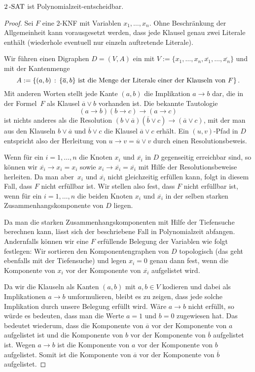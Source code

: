 \begin{thm}
	${2}\operatorname{-SAT}$ ist Polynomialzeit-entscheidbar.  
\end{thm} 
\begin{proof}
	Sei $F$ eine $2$-KNF mit Variablen $x_1,\ldots,x_n$. Ohne Beschränkung der Allgemeinheit kann vorausgesetzt werden, dass jede Klausel genau zwei Literale enthält (wiederhole eventuell nur einzeln auftretende Literale).
	
	Wir führen einen Digraphen $D=(V,A)$ ein mit 
	$V := \{x_1,\ldots,x_n,\overline{x_1},\ldots,\overline{x_n} \}$ und mit der Kantenmenge 
	\[
			A := \left\{ (a,b) \,:\,  \{\overline{a},b\} \ \text{ist die Menge der Literale einer der Klauseln von} \  F \right\} .
	\]
	Mit anderen Worten stellt jede Kante $(a,b)$ die Implikation $a \to b$ dar, die in der Formel~$F$ als Klausel $\overline{a} \vee b$ vorhanden ist.
\condclearpage	
	Die bekannte Tautologie 
	\[
		 	(a \to b) (b \to c)  \to (a \to c)
	\]
	ist nichts anderes als die Resolution $(b \vee \overline{a}) ( \overline{b} \vee c) \to (\overline{a} \vee c)$, mit der man aus den Klauseln $b \vee \overline{a}$ und  $\overline{b} \vee c$ die Klausel $\overline{a} \vee c$ erhält. Ein $(u,v)$-Pfad in $D$ entspricht also der Herleitung von $u \to v = \overline{u} \vee v$ durch einen Resolutionsbeweis.
	
	Wenn für ein $i=1,\ldots,n$ die Knoten $x_i$ und $\overline{x_i}$ in $D$ gegenseitig erreichbar sind, so können wir $\overline{x_i} \to  x_i  = x_i$ sowie $x_i \to \overline{x_i} = \overline{x_i}$ mit Hilfe der Resolutionsbeweise herleiten. Da man aber~$x_i$ und $\overline{x_i}$ nicht gleichzeitig erfüllen kann, folgt in diesem Fall, dass $F$ nicht erfüllbar ist. 
	Wir stellen also fest, dass $F$ nicht erfüllbar ist, wenn für ein $i =1,\ldots,n$ die beiden Knoten $x_i$ und $\overline{x_i}$ in der selben starken Zusammenhangskomponente von $D$ liegen. 
	
	 Da man die starken Zusammenhangskomponenten mit Hilfe der Tiefensuche berechnen kann, lässt sich der beschriebene Fall in Polynomialzeit abfangen. 
\condclearpage	
	Andernfalls können wir eine $F$ erfüllende Belegung der Variablen wie folgt festlegen: Wir sortieren den Komponentengraphen von $D$  topologisch (das geht ebenfalls mit der Tiefensuche) und legen $x_i=0$ genau dann fest, wenn die Komponente von $x_i$ vor der Komponente von $\overline{x_i}$ aufgelistet wird.
	
	 Da wir die Klauseln als Kanten $(a,b)$ mit $a,b \in V$ kodieren und dabei als Implikationen $a \to b$ umformulieren, bleibt es zu zeigen, dass jede solche Implikation durch unsere Belegung erfüllt wird. Wäre $a \to b$ nicht erfüllt, so würde es bedeuten, dass man die Werte $a=1$ und $b=0$ zugewiesen hat. Das bedeutet wiederum, dass die Komponente von $\overline{a}$ vor der Komponente von $a$ aufgelistet ist und die Komponente von $b$ vor der Komponente von $\overline{b}$ aufgelistet ist. Wegen $ a \to b$ ist die Komponente von $a$ vor der Komponente von $b$ aufgelistet. Somit ist die Komponente von $\overline{a}$ vor der Komponente von $\overline{b}$ aufgelistet.
	 

\end{proof}
